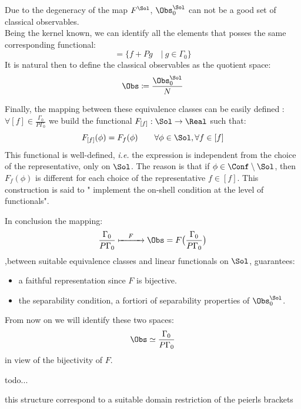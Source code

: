 \documentclass[a4paper,10pt]{report}
\begin{document}
	\begin{definition}
  					Due to the degeneracy of the map $F^\Sol$, %
   					$\Obs_0^\Sol$ can not be a good set of classical observables.\\
   					Being the kernel known, we can identify all the elements that posses the same corresponding functional:
   					\begin{displaymath}
   						[f] = \big\{f + P g \quad\vert\: g \in \Gamma_0\big\}
   					\end{displaymath}
   					It is natural then to define the classical observables as the quotient space:
   									\begin{displaymath}
   										\Obs \coloneqq \frac{\Obs_0^\Sol}{N}
   									\end{displaymath}

   					Finally, the mapping between these equivalence classes can be easily defined :\\
   					$\forall [f] \in \frac{\Gamma_0}{P\Gamma_0}$ we build the functional $F_{[f]} : \Sol \rightarrow  \Real$ such that:
   					\begin{displaymath}
   						F_{[f]} (\phi) = F_f(\phi) \qquad \forall \phi \in \Sol , \forall f \in [f]
   					\end{displaymath}
   					This functional is well-defined, \textit{i.e.} the expression is independent from the choice of the representative, only on $\Sol$.
   					The reason is that if $\phi \in \Conf \setminus \Sol$, then $F_f(\phi)$ is different for each choice of the representative $f \in [f]$.
   					This construction is said to " implement the  on-shell condition at the level of functionals".

   					In conclusion the mapping:
   					\begin{displaymath}
   						\frac{\Gamma_0}{P \Gamma_0}  \xmapsto{\quad F \quad} \Obs = F \big( \frac{\Gamma_0}{P \Gamma_0}\big)
   					\end{displaymath}
   					,between suitable equivalence classes  and linear functionals on $\Sol$, guarantees:
   					\begin{itemize}
   						\item a faithful representation since $F$ is bijective.
   						\item the separability condition, a fortiori of separability properties of $\Obs_0^\Sol$.
   					\end{itemize}
   					From now on we will identify these two spaces:
   					\begin{displaymath}
   						\Obs \simeq 	\frac{\Gamma_0}{P \Gamma_0}
   					\end{displaymath}
   					in view of the bijectivity of $F$.
	\end{definition}
	
	\begin{definition}
	todo...
	\end{definition}
	\begin{proposition}
		this structure correspond to a suitable domain restriction of the peierls brackets
	\end{proposition}
\end{document}
